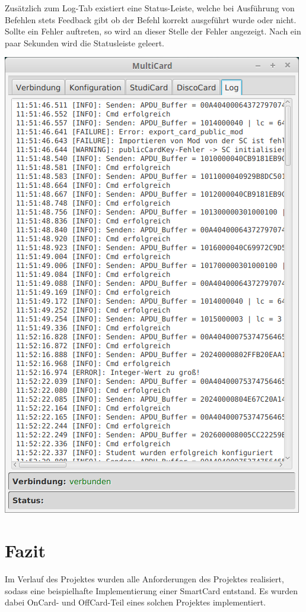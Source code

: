 Zusätzlich zum Log-Tab existiert eine Status-Leiste, welche bei Ausführung von Befehlen stets Feedback gibt ob der Befehl korrekt ausgeführt wurde oder nicht.
Sollte ein Fehler auftreten, so wird an dieser Stelle der Fehler angezeigt.
Nach ein paar Sekunden wird die Statusleiste geleert.

\begin{center}
	\includegraphics[scale=0.4]{Images/LogTab}
\end{center} 
 
\section{Fazit}
Im Verlauf des Projektes wurden alle Anforderungen des Projektes  realisiert, sodass eine beispielhafte Implementierung einer SmartCard entstand.
Es wurden dabei OnCard- und OffCard-Teil eines solchen Projektes implementiert.

